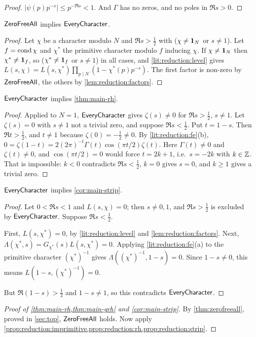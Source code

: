 \begin{proof}
$|\psi(p)p^{-s}|\le p^{-\Re s}<1$. And $\Gamma$ has no zeros, and no poles in $\Re s>0$.
\end{proof}

\begin{proposition}\label{prop:reduction:imprimitive}
$\mathsf{ZeroFreeAll}$ implies $\mathsf{EveryCharacter}$. 
\end{proposition}

\begin{proof}
Let $\chi$ be a character modulo $N$ and $\Re s>\frac12$ with ($\chi\ne\mathbf{1}_N$ or $s\ne1$). Let
$f=\operatorname{cond}\chi$ and $\chi^*$ the primitive character modulo $f$ inducing $\chi$. If $\chi\ne\mathbf{1}_N$ then
$\chi^*\ne\mathbf{1}_f$, so ($\chi^*\neq\mathbf{1}_f$ or $s\ne1$) in all cases, and \cref{lit:reduction:level}
gives $L(s,\chi)=L(s,\chi^*)\prod_{p\mid N}(1-\chi^*(p)p^{-s})$. The first factor is non-zero by
$\mathsf{ZeroFreeAll}$, the others by \cref{lem:reduction:factors}.
\end{proof}

\begin{proposition}\label{prop:reduction:rh}
$\mathsf{EveryCharacter}$ implies \cref{thm:main-rh}. 
\end{proposition}

\begin{proof}
Applied to $N=1$, $\mathsf{EveryCharacter}$ gives $\zeta(s)\ne0$ for $\Re s>\frac12$, $s\ne1$. Let
$\zeta(s)=0$ with $s\ne1$ not a trivial zero, and suppose $\Re s<\frac12$. Put $t=1-s$. Then
$\Re t>\frac12$, and $t\ne1$ because $\zeta(0)=-\frac12\ne0$. By \cref{lit:reduction:fe}(b),
$0=\zeta(1-t)=2(2\pi)^{-t}\Gamma(t)\cos(\pi t/2)\zeta(t)$. Here $\Gamma(t)\ne0$ and $\zeta(t)\ne0$, and
$\cos(\pi t/2)=0$ would force $t=2k+1$, i.e.\ $s=-2k$ with $k\in\mathbb{Z}$. That is impossible: $k<0$
contradicts $\Re s<\frac12$, $k=0$ gives $s=0$, and $k\ge1$ gives a trivial zero.
\end{proof}

\begin{proposition}\label{prop:reduction:strip}
$\mathsf{EveryCharacter}$ implies \cref{cor:main-strip}. 
\end{proposition}

\begin{proof}
Let $0<\Re s<1$ and $L(s,\chi)=0$; then $s\neq0,1$, and $\Re s>\frac12$ is excluded by
$\mathsf{EveryCharacter}$. Suppose $\Re s<\frac12$.

First, $L(s,\chi^*)=0$, by \cref{lit:reduction:level} and \cref{lem:reduction:factors}. Next,
$\Lambda(\chi^*,s)=G_{\chi^*}(s)L(s,\chi^*)=0$. Applying \cref{lit:reduction:fe}(a) to the primitive
character $(\chi^*)^{-1}$ gives $\Lambda((\chi^*)^{-1},1-s)=0$. Since $1-s\neq0$, this means
$L(1-s,(\chi^*)^{-1})=0$.

But $\Re(1-s)>\frac12$ and $1-s\neq1$, so this contradicts $\mathsf{EveryCharacter}$.
\end{proof}

\begin{proof}[Proof of \cref{thm:main-rh,thm:main-grh} and \cref{cor:main-strip}]
By \cref{thm:zerofreeall}, proved in \cref{sec:top}, $\mathsf{ZeroFreeAll}$ holds. Now apply
\cref{prop:reduction:imprimitive,prop:reduction:rh,prop:reduction:strip}.
\end{proof}
